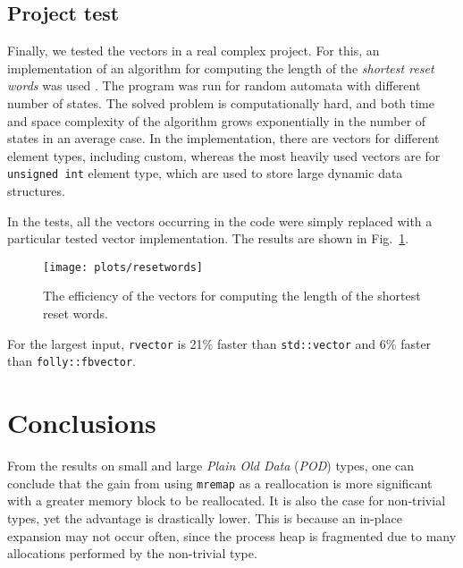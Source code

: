 \documentclass[inz, english, shortabstract]{iithesis}
\begin{document}
\clearpage
\section{Project test}
Finally, we tested the vectors in a real complex project.
For this, an implementation of an algorithm for computing the length of the \emph{shortest reset words} was used \cite{KKS2015}.
The program was run for random automata with different number of states.
The solved problem is computationally hard, and both time and space complexity of the algorithm grows exponentially in the number of states in an average case.
In the implementation, there are vectors for different element types, including custom, whereas the most heavily used vectors are for {\tt unsigned int} element type, which are used to store large dynamic data structures.

In the tests, all the vectors occurring in the code were simply replaced with a particular tested vector implementation.
The results are shown in Fig.~\ref{resetwords}.

\begin{figure}[h!]
\texttt{[image: plots/resetwords]}
\caption{The efficiency of the vectors for computing the length of the shortest reset words.}
\label{resetwords}
\end{figure}

For the largest input, {\tt rvector} is 21\% faster than {\tt std::vector} and 6\% faster than {\tt folly::fbvector}.

\chapter{Conclusions}

From the results on small and large \emph{Plain Old Data} (\emph{POD}) types, one can conclude that the gain from using {\tt mremap} as a reallocation is more significant with a greater memory block to be reallocated.
It is also the case for non-trivial types, yet the advantage is drastically lower.
This is because an in-place expansion may not occur often, since the process heap is fragmented due to many allocations performed by the non-trivial type.
\end{document}
